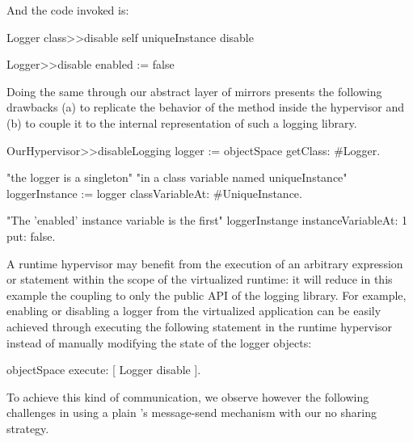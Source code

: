 And the code invoked is:

\begin{code}
Logger class>>disable
	self uniqueInstance disable
	
Logger>>disable
	enabled := false
\end{code}

Doing the same through our abstract layer of mirrors presents the following drawbacks (a) to replicate the behavior of the  method inside the hypervisor and (b) to couple it to the internal representation of such a logging library. 

\begin{code}
OurHypervisor>>disableLogging
	logger := objectSpace getClass: #Logger.

	"the logger is a singleton"
	"in a class variable named uniqueInstance"
	loggerInstance := logger classVariableAt: #UniqueInstance.

	"The 'enabled' instance variable is the first"
	loggerInstange instanceVariableAt: 1 put: false.
\end{code}

A runtime hypervisor may benefit from the execution of an arbitrary expression or statement within the scope of the virtualized runtime: it will reduce in this example the coupling to only the public API of the logging library. For example, enabling or disabling a logger from the virtualized application can be easily achieved through executing the following statement in the runtime hypervisor instead of manually modifying the state of the logger objects:

\begin{code}
objectSpace execute: [ Logger disable ].
\end{code}

To achieve this kind of communication, we observe however the following challenges in using a plain \VM's message-send mechanism with our no sharing strategy.

